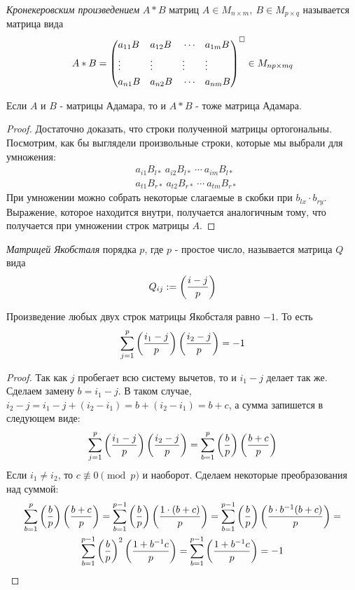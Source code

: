 \begin{definition}
	\textit{Кронекеровским произведением} $A * B$ матриц $A \in M_{n \times m},\ B \in M_{p \times q}$ называется матрица вида
	\[
		A * B = \left(\begin{aligned}
			&a_{11}B & &a_{12}B & &\cdots & &a_{1m}B \\
			&\vdots & &\vdots & &\vdots & &\vdots \\
			&a_{n1}B & &a_{n2}B & & \cdots & &a_{nm}B
		\end{aligned}\right)^{\square} \in M_{np \times mq}
	\]
\end{definition}

\begin{proposition}
	Если $A$ и $B$ - матрицы Адамара, то и $A * B$ - тоже матрица Адамара.
\end{proposition}

\begin{proof}
	Достаточно доказать, что строки полученной матрицы ортогональны. Посмотрим, как бы выглядели произвольные строки, которые мы выбрали для умножения:
	\begin{align*}
		&{a_{i1}B_{l*}\ a_{i2}B_{l*}\ \cdots \ a_{im}B_{l*}}
		\\
		&{a_{t1}B_{r*}\ a_{t2}B_{r*}\ \cdots \ a_{tm}B_{r*}}
	\end{align*}
	При умножении можно собрать некоторые слагаемые в скобки при $b_{lx} \cdot b_{ry}$. Выражение, которое находится внутри, получается аналогичным тому, что получается при умножении строк матрицы $A$.
\end{proof}

\begin{definition}
	\textit{Матрицей Якобсталя} порядка $p$, где $p$ - простое число, называется матрица $Q$ вида
	\[
		Q_{ij} := \left(\frac{ i - j }{ p }\right)
	\]
\end{definition}

\begin{proposition}
	Произведение любых двух строк матрицы Якобсталя равно $-1$. То есть
	\[
		\sum\limits_{j = 1}^p \left(\frac{ i_1 - j }{ p }\right) \left(\frac{ i_2 - j }{ p }\right) = -1
	\]
\end{proposition}

\begin{proof}
	Так как $j$ пробегает всю систему вычетов, то и $i_1 - j$ делает так же. Сделаем замену $b = i_1 - j$. В таком случае, $i_2 - j = i_1 - j + (i_2 - i_1) = b + (i_2 - i_1) = b + c$, а сумма запишется в следующем виде:
	\[
		\sum\limits_{j = 1}^p \left(\frac{ i_1 - j }{ p }\right) \left(\frac{ i_2 - j }{ p }\right) = \sum\limits_{b = 1}^p \left(\frac{ b }{ p }\right) \left(\frac{ b + c }{ p }\right)
	\]
	Если $i_1 \neq i_2$, то $c \not\equiv 0 \pmod p$ и наоборот. Сделаем некоторые преобразования над суммой:
	\begin{multline*}
		\sum\limits_{b = 1}^p \left(\frac{ b }{ p }\right) \left(\frac{ b + c }{ p }\right) = \sum\limits_{b = 1}^{p - 1} \left(\frac{ b }{ p }\right) \left(\frac{ 1 \cdot (b + c) }{ p }\right) = \sum\limits_{b = 1}^{p - 1} \left(\frac{ b }{ p }\right) \left(\frac{ b \cdot b^{-1} (b + c) }{ p }\right) =
		\\
		\sum\limits_{b = 1}^{p - 1} \left(\frac{ b }{ p }\right)^2 \left(\frac{ 1 + b^{-1}c }{ p }\right) = \sum\limits_{b = 1}^{p - 1} \left(\frac{ 1 + b^{-1}c }{ p }\right) = -1
	\end{multline*}
\end{proof}

